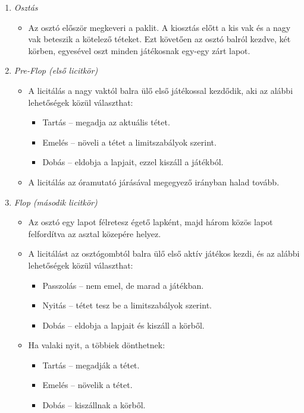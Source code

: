\documentclass[]{thesis-ekf}
\theoremstyle{definition}
\theoremstyle{remark}
\begin{document}
\begin{enumerate}
	\item \emph{Osztás}
	\begin{itemize}
		\item Az osztó először megkeveri a paklit. A kiosztás előtt a kis vak és a nagy vak beteszik a kötelező téteket. Ezt követően az osztó balról kezdve, két körben, egyesével oszt minden játékosnak egy-egy zárt lapot.
	\end{itemize}
	\item \emph{Pre-Flop (első licitkör)}
	\begin{itemize}
		\item A licitálás a nagy vaktól balra ülő első játékossal kezdődik, aki az alábbi lehetőségek közül választhat:
		\begin{itemize}
			\item Tartás -- megadja az aktuális tétet.
			\item Emelés -- növeli a tétet a limitszabályok szerint.
			\item Dobás -- eldobja a lapjait, ezzel kiszáll a játékból.
		\end{itemize}
		\item A licitálás az óramutató járásával megegyező irányban halad tovább.
		\end{itemize}
	\item \emph{Flop (második licitkör)}
	\begin{itemize}
		\item Az osztó egy lapot félretesz égető lapként, majd három közös lapot felfordítva az asztal közepére helyez.
		\item A licitálást az osztógombtól balra ülő első aktív játékos kezdi, és az alábbi lehetőségek közül választhat:
		\begin{itemize}
			\item Passzolás -- nem emel, de marad a játékban.
			\item Nyitás -- tétet tesz be a limitszabályok szerint.
			\item Dobás -- eldobja a lapjait és kiszáll a körből.
		\end{itemize}
		\item Ha valaki nyit, a többiek dönthetnek:
		\begin{itemize}
			\item Tartás -- megadják a tétet.
			\item Emelés -- növelik a tétet.
			\item Dobás -- kiszállnak a körből.
		\end{itemize}

\end{itemize}
\end{enumerate}
\end{document}
